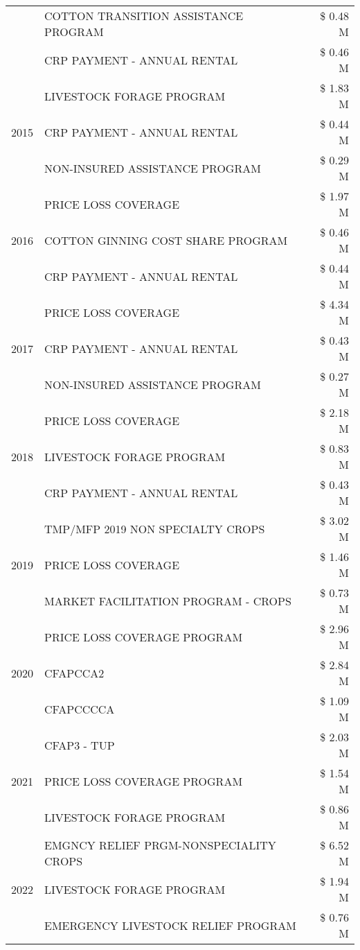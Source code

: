 \begin{tabular}{llr}
 & COTTON TRANSITION ASSISTANCE PROGRAM & \$ 0.48 M \\
 & CRP PAYMENT - ANNUAL RENTAL & \$ 0.46 M \\
\cline{1-3}
\multirow[t]{3}{*}{2015} & LIVESTOCK FORAGE PROGRAM & \$ 1.83 M \\
 & CRP PAYMENT - ANNUAL RENTAL & \$ 0.44 M \\
 & NON-INSURED ASSISTANCE PROGRAM & \$ 0.29 M \\
\cline{1-3}
\multirow[t]{3}{*}{2016} & PRICE LOSS COVERAGE & \$ 1.97 M \\
 & COTTON GINNING COST SHARE PROGRAM & \$ 0.46 M \\
 & CRP PAYMENT - ANNUAL RENTAL & \$ 0.44 M \\
\cline{1-3}
\multirow[t]{3}{*}{2017} & PRICE LOSS COVERAGE & \$ 4.34 M \\
 & CRP PAYMENT - ANNUAL RENTAL & \$ 0.43 M \\
 & NON-INSURED ASSISTANCE PROGRAM & \$ 0.27 M \\
\cline{1-3}
\multirow[t]{3}{*}{2018} & PRICE LOSS COVERAGE & \$ 2.18 M \\
 & LIVESTOCK FORAGE PROGRAM & \$ 0.83 M \\
 & CRP PAYMENT - ANNUAL RENTAL & \$ 0.43 M \\
\cline{1-3}
\multirow[t]{3}{*}{2019} & TMP/MFP 2019 NON SPECIALTY CROPS & \$ 3.02 M \\
 & PRICE LOSS COVERAGE & \$ 1.46 M \\
 & MARKET FACILITATION PROGRAM - CROPS & \$ 0.73 M \\
\cline{1-3}
\multirow[t]{3}{*}{2020} & PRICE LOSS COVERAGE PROGRAM & \$ 2.96 M \\
 & CFAPCCA2 & \$ 2.84 M \\
 & CFAPCCCCA & \$ 1.09 M \\
\cline{1-3}
\multirow[t]{3}{*}{2021} & CFAP3 - TUP & \$ 2.03 M \\
 & PRICE LOSS COVERAGE PROGRAM & \$ 1.54 M \\
 & LIVESTOCK FORAGE PROGRAM & \$ 0.86 M \\
\cline{1-3}
\multirow[t]{3}{*}{2022} & EMGNCY RELIEF PRGM-NONSPECIALITY CROPS & \$ 6.52 M \\
 & LIVESTOCK FORAGE PROGRAM & \$ 1.94 M \\
 & EMERGENCY LIVESTOCK RELIEF PROGRAM & \$ 0.76 M \\
\cline{1-3}
\bottomrule
\end{tabular}
